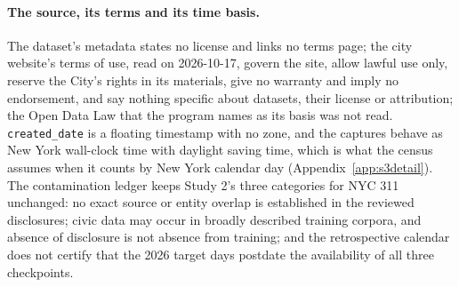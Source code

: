 \paragraph{The source, its terms and its time basis.} The dataset's metadata states no license and links
no terms page; the city website's terms of use, read on 2026-10-17, govern the site, allow lawful use only,
reserve the City's rights in its materials, give no warranty and imply no endorsement, and say nothing
specific about datasets, their license or attribution; the Open Data Law that the program names as its
basis was not read. \texttt{created\_date} is a floating timestamp with no zone, and the captures behave as
New York wall-clock time with daylight saving time, which is what the census assumes when it counts by New
York calendar day (Appendix~\ref{app:s3detail}). The contamination ledger keeps Study 2's three categories
for NYC 311 unchanged: no exact source or entity overlap is established in the reviewed disclosures; civic
data may occur in broadly described training corpora, and absence of disclosure is not absence from
training; and the retrospective calendar does not certify that the 2026 target days postdate the
availability of all three checkpoints.
